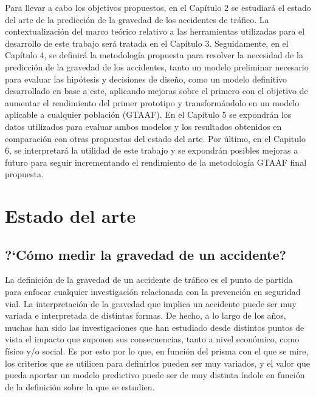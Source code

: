 \documentclass{uathesis-es}
\begin{document}
	Para llevar a cabo los objetivos propuestos, en el Capítulo 2 se estudiará el estado del arte de la predicción de la gravedad de los accidentes de tráfico. La contextualización del marco teórico relativo a las herramientas utilizadas para el desarrollo de este trabajo será tratada en el Capítulo 3. Seguidamente, en el Capítulo 4, se definirá la metodología propuesta para resolver la necesidad de la predicción de la gravedad de los accidentes, tanto un modelo preliminar necesario para evaluar las hipótesis y decisiones de diseño, como un modelo definitivo desarrollado en base a este, aplicando mejoras sobre el primero con el objetivo de aumentar el rendimiento del primer prototipo y transformándolo en un modelo aplicable a cualquier población (GTAAF). En el Capítulo 5 se expondrán los datos utilizados para evaluar ambos modelos y los resultados obtenidos en comparación con otras propuestas del estado del arte. Por último, en el Capitulo 6, se interpretará la utilidad de este trabajo y se expondrán posibles mejoras a futuro para seguir incrementando el rendimiento de la metodología GTAAF final propuesta.
	
	
	\chapter{Estado del arte}
	
	\section{?`Cómo medir la gravedad de un accidente?}
	
	La definición de la gravedad de un accidente de tráfico es el punto de partida para enfocar cualquier investigación relacionada con la prevención en seguridad vial. La interpretación de la gravedad que implica un accidente puede ser muy variada e interpretada de distintas formas. De hecho, a lo largo de los años, muchas han sido las investigaciones que han estudiado desde distintos puntos de vista el impacto que suponen sus consecuencias, tanto a nivel económico, como físico y/o social. Es por esto por lo que, en función del prisma con el que se mire, los criterios que se utilicen para definirlos pueden ser muy variados, y el valor que pueda aportar un modelo predictivo puede ser de muy distinta índole en función de la definición sobre la que se estudien.
	
\end{document}
